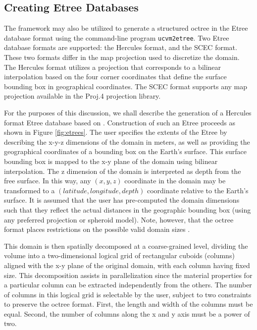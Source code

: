 

\subsection{Creating Etree Databases}

The framework may also be utilized to generate a structured octree in the Etree database format \citep{Tu_2003_Tech} using the command-line program \texttt{ucvm2etree}. Two Etree database formats are supported: the Hercules format, and the SCEC format. These two formats differ in the map projection used to discretize the domain. The Hercules format utilizes a projection that corresponds to a bilinear interpolation based on the four corner coordinates that define the surface bounding box in geographical coordinates. The SCEC format supports any map projection available in the Proj.4 projection library.

For the purposes of this discussion, we shall describe the generation of a Hercules format Etree database based on \citet{Taborda_2007_Proc}. Construction of such an Etree proceeds as shown in Figure \ref{fig:etrees}. The user specifies the extents of the Etree by describing the x-y-z dimensions of the domain in meters, as well as providing the geographical coordinates of a bounding box on the Earth's surface. This surface bounding box is mapped to the x-y plane of the domain using bilinear interpolation. The z dimension of the domain is interpreted as depth from the free surface. In this way, any $(x,y,z)$ coordinate in the domain may be transformed to a $(latitude, longitude, depth)$ coordinate relative to the Earth's surface. It is assumed that the user has pre-computed the domain dimensions such that they reflect the actual distances in the geographic bounding box (using any preferred projection or spheroid model). Note, however, that the octree format places restrictions on the possible valid domain sizes \citep{Tu_2003_Tech, Taborda_2007_Proc}.

This domain is then spatially decomposed at a coarse-grained level, dividing the volume into a two-dimensional logical grid of rectangular cuboids (columns) aligned with the x-y plane of the original domain, with each column having fixed size. This decomposition assists in parallelization since the material properties for a particular column can be extracted independently from the others. The number of columns in this logical grid is selectable by the user, subject to two constraints to preserve the octree format. First, the length and width of the columns must be equal. Second, the number of columns along the x and y axis must be a power of two.

